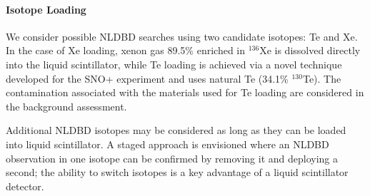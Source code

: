 \paragraph{Isotope Loading}
We consider possible NLDBD searches using two candidate isotopes: Te and Xe.
In the case of Xe loading, xenon gas 89.5\% enriched in $^{136}$Xe is
dissolved directly into
the liquid scintillator, while Te loading is achieved via a novel
technique developed for the SNO+ experiment
and uses natural Te (34.1\% $^\mathrm{130}$Te).
The contamination associated with the materials used for Te loading are
considered in the background assessment.

Additional NLDBD isotopes may be considered as long as they can be loaded into
liquid scintillator. A staged approach is envisioned where an
NLDBD observation in one isotope can be confirmed by removing it and deploying
a second; the ability to switch isotopes is a key advantage of a liquid
scintillator detector.

